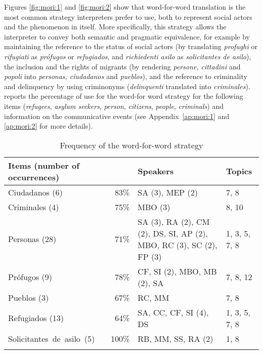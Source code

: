 \documentclass[output=paper]{langscibook}
\begin{document}
Figures \ref{fig:mori:1} and \ref{fig:mori:2} show that word-for-word translation  is the most common strategy interpreters prefer to use, both to represent social actors and the phenomenon in itself. More specifically, this strategy allows the interpreter to convey both semantic and pragmatic equivalence, for example by maintaining the reference to the status of social actors (by translating \textit{profughi} or \textit{rifugiati} as \textit{prófugos} or \textit{refugiados}, and \textit{richiedenti asilo} as \textit{solicitantes de asilo}), the inclusion and the rights of migrants (by rendering \textit{persone,} \textit{cittadini} and \textit{popoli} into \textit{personas, ciudadanos} and \textit{pueblos}), and the reference to criminality and delinquency by using criminonyms (\textit{delinquenti} translated into \textit{criminales}).  reports the percentage of use for the word-for word strategy for the following items (\textit{refugees}, \textit{asylum seekers}, \textit{person}, \textit{citizens}, \textit{people}, \textit{criminals}) and information on the communicative events (see Appendix~\ref{ap:mori:1} and \ref{ap:mori:2} for more details).

\begin{table}
\begin{tabularx}{\textwidth}{QrXp{1.7cm}}

\lsptoprule

{\bfseries Items (number of occurrences)} & {\bfseries {}} & {\bfseries Speakers} & {\bfseries Topics}\\
\midrule
Ciudadanos (6) & 83\% & SA (3), MEP (2) & 7, 8\\
Criminales (4) & 75\% & MBO (3) & 8, 10\\
Personas (28) & 71\% & SA (3), RA (2), CM (2), DS, SI, AP (2), MBO, RC (3), SC (2), FP (3) & 1, 3, 5, 7, 8\\
Prófugos (9) & 78\% & CF, SI (2), MBO, MB (2), SA & 7, 8, 12\\
Pueblos (3) & 67\% & RC, MM & 7, 8\\
Refugiados (13) & 64\% & SA, CC, CF, SI (4), DS & 1, 3, 5, 7, 8\\
\mbox{Solicitantes de asilo (5)} & 100\% & RB, MM, SS, RA (2) & 1, 8\\
\lspbottomrule
\end{tabularx}

\caption{Frequency of the word-for-word strategy}
\label{tab:mori:1}
\end{table}
\end{document}
